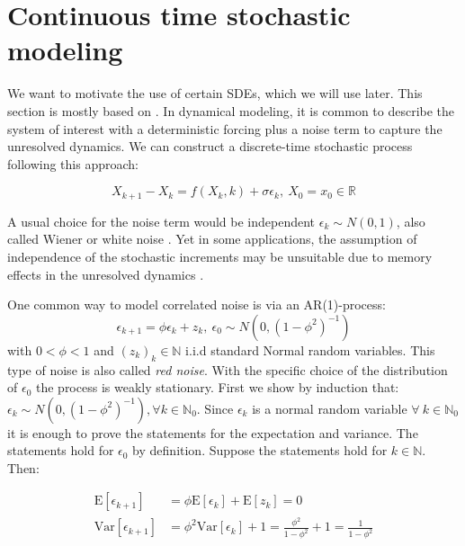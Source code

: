 \documentclass[%
thesis=student,%
coverpage=false,%
titlepage=false,%
headmarks=true, %
english,%
font=libertine, %
math=newpxtx, %
BCOR=5mm,%
coverBCOR=11mm%
]{tumbook}
\begin{document}
\section{Continuous time stochastic modeling}
\label{Continuous time stochastic modeling}

We want to motivate the use of certain SDEs, which we will use later. This section is mostly based on \cite{Morr:2022}.
In dynamical modeling, it is common to describe the system of interest with a deterministic forcing plus a noise term to capture the unresolved dynamics. We can construct a discrete-time stochastic process following this approach:

\begin{equation}
    X_{k+1}-X_{k} = f(X_{k},k) + \sigma\epsilon_{k}, \ X_{0} = x_{0} \in \mathbb{R}
    \label{eq:discrete-time modelling}
\end{equation}

A usual choice for the noise term would be independent $\epsilon_{k} \sim N(0,1)$, also called Wiener or white noise \cite{zwanzig:2001}.
Yet in some applications, the assumption of independence of the stochastic increments may be unsuitable due to memory effects in the unresolved dynamics \cite{zwanzig:1961,chorin:2000}.

One common way to model correlated noise is via an AR(1)-process:
\[
\epsilon_{k+1} = \phi\epsilon_{k} + z_{k}, \ \epsilon_{0} \sim N(0,(1-\phi^2)^{-1})
\]
with $0<\phi<1$ and $(z_{k})_{k}\in\mathbb{N}$ i.i.d standard Normal random variables. This type of noise is also called \textit{red noise}. With the specific choice of the distribution of $\epsilon_{0}$ the process is weakly stationary. 
First we show by induction that: $\epsilon_{k} \sim N(0,(1-\phi^2)^{-1}), \forall k \in \mathbb{N}_{0}$. Since $\epsilon_{k}$ is a normal random variable $\forall \ k \in \mathbb{N}_{0}$ it is enough to prove the statements for the expectation and variance. The statements hold for $\epsilon_{0}$ by definition. Suppose the statements hold for $k \in \mathbb{N}$. Then:

\begin{subequations}
    \begin{align}
        \mathrm{E}[\epsilon_{k+1}] &= \phi \mathrm{E}[\epsilon_{k}] + \mathrm{E}[z_{k}]  = 0 \\
        \mathrm{Var}[\epsilon_{k+1}] &= \phi^2 \mathrm{Var}[\epsilon_{k}] + 1 = \frac{\phi^2}{1-\phi^2} + 1 = \frac{1}{1-\phi^2}     
    \end{align}
\end{subequations}   
\end{document}
